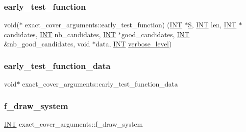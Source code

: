 \subsubsection{\texorpdfstring{early\+\_\+test\+\_\+function}{early\_test\_function}}
{\footnotesize\ttfamily void($\ast$ exact\+\_\+cover\+\_\+arguments\+::early\+\_\+test\+\_\+function) (\mbox{\hyperlink{galois_8h_a09fddde158a3a20bd2dcadb609de11dc}{I\+NT}} $\ast$\mbox{\hyperlink{simeon_8_c_adab47f8243f1b5a2c31df2535d6b37d0}{S}}, \mbox{\hyperlink{galois_8h_a09fddde158a3a20bd2dcadb609de11dc}{I\+NT}} len, \mbox{\hyperlink{galois_8h_a09fddde158a3a20bd2dcadb609de11dc}{I\+NT}} $\ast$candidates, \mbox{\hyperlink{galois_8h_a09fddde158a3a20bd2dcadb609de11dc}{I\+NT}} nb\+\_\+candidates, \mbox{\hyperlink{galois_8h_a09fddde158a3a20bd2dcadb609de11dc}{I\+NT}} $\ast$good\+\_\+candidates, \mbox{\hyperlink{galois_8h_a09fddde158a3a20bd2dcadb609de11dc}{I\+NT}} \&nb\+\_\+good\+\_\+candidates, void $\ast$data, \mbox{\hyperlink{galois_8h_a09fddde158a3a20bd2dcadb609de11dc}{I\+NT}} \mbox{\hyperlink{simeon_8_c_a818073fbcc2f439e7c56952f67386122}{verbose\+\_\+level}})}

\mbox{\label{classexact__cover__arguments_af4dc73c0321a085d5bc9ef0f754fda38}} 
\subsubsection{\texorpdfstring{early\+\_\+test\+\_\+function\+\_\+data}{early\_test\_function\_data}}
{\footnotesize\ttfamily void$\ast$ exact\+\_\+cover\+\_\+arguments\+::early\+\_\+test\+\_\+function\+\_\+data}

\mbox{\label{classexact__cover__arguments_ab7d70749e3b79c47a62358b1619cac12}} 
\subsubsection{\texorpdfstring{f\+\_\+draw\+\_\+system}{f\_draw\_system}}
{\footnotesize\ttfamily \mbox{\hyperlink{galois_8h_a09fddde158a3a20bd2dcadb609de11dc}{I\+NT}} exact\+\_\+cover\+\_\+arguments\+::f\+\_\+draw\+\_\+system}

